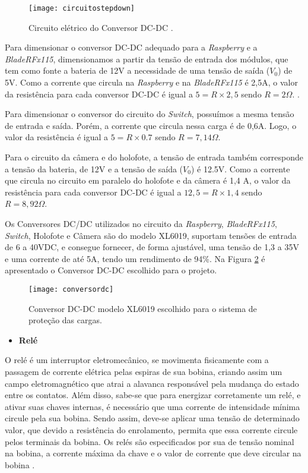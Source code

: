 \begin{figure}[H]
\centering
\texttt{[image: circuitostepdown]}
    \caption{Circuito elétrico do Conversor DC-DC \cite{Amauri}.}
\label{fig:circuitostepdown}
\end{figure}


Para dimensionar o conversor DC-DC adequado para a \textit{Raspberry} e a \textit{BladeRFx115}, dimensionamos a partir da tensão de entrada dos módulos, que tem como fonte a bateria de 12V a necessidade de uma tensão de saída ($V_0$) de 5V. Como a corrente que circula na \textit{Raspberry} e na \textit{BladeRFx115} é 2,5A, o valor da resistência para cada conversor DC-DC é igual a $5=R \times 2,5$ sendo $R= 2 \Omega$. \cite{MSM}.

Para dimensionar o conversor do circuito do \textit{Switch}, possuímos a mesma tensão de entrada e saída. Porém, a corrente que circula nessa carga é de 0,6A. Logo, o valor da resistência é igual a $5=R \times 0.7$ sendo $R= 7,14 \Omega$.

Para o circuito da câmera e do holofote, a tensão de entrada também corresponde a tensão da bateria, de 12V e a tensão de saída ($V_0$) é 12.5V. Como a corrente que circula no circuito em paralelo do holofote e da câmera é 1,4 A, o valor da resistência para cada conversor DC-DC é igual a $12,5=R \times 1,4$ sendo $R= 8,92 \Omega$.

Os Conversores DC/DC utilizados no circuito da \textit{Raspberry}, \textit{BladeRFx115}, \textit{Switch}, Holofote e Câmera são do modelo XL6019, suportam tensões de entrada de 6 a 40VDC, e consegue fornecer, de forma ajustável, uma tensão de 1,3 a 35V e uma corrente de até 5A, tendo um rendimento de 94\%. Na Figura \ref{fig:conversordc} é apresentado o Conversor DC-DC escolhido para o projeto.


\begin{figure}[H]
\centering
\texttt{[image: conversordc]}
    \caption{Conversor DC-DC modelo XL6019 escolhido para o sistema de proteção das cargas.}
\label{fig:conversordc}
\end{figure}
\FloatBarrier


\begin{itemize}

    \item \textbf{Relé}
    
\end{itemize}

O relé é um interruptor eletromecânico, se movimenta fisicamente com a passagem de corrente elétrica pelas espiras de sua bobina, criando assim um campo eletromagnético que atrai a alavanca responsável pela mudança do estado entre os contatos. Além disso, sabe-se que para energizar corretamente um relé, e ativar suas chaves internas, é necessário que uma corrente de intensidade mínima circule pela sua bobina. Sendo assim, deve-se aplicar uma tensão de determinado valor, que devido a resistência do enrolamento, permita que essa corrente circule pelos terminais da bobina. Os relés são especificados por sua de tensão nominal na bobina, a corrente máxima da chave e o valor de corrente que deve circular na bobina \cite{Braga}.

